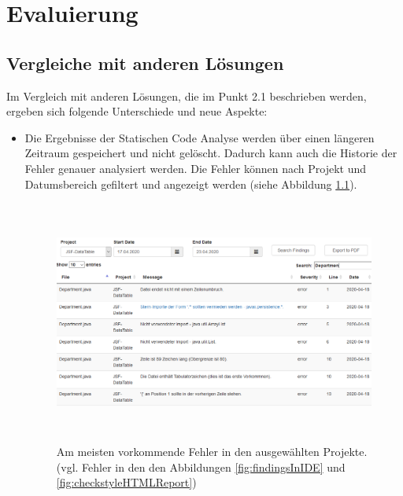 \chapter{Evaluierung}
\section{Vergleiche mit anderen Lösungen} 
Im Vergleich mit anderen Lösungen, die im Punkt 2.1 beschrieben werden, ergeben sich folgende Unterschiede und neue Aspekte: 
\begin{itemize}
\item Die Ergebnisse der Statischen Code Analyse werden über einen längeren Zeitraum gespeichert und nicht gelöscht. Dadurch kann auch die Historie der Fehler genauer analysiert werden. Die Fehler können nach Projekt und Datumsbereich gefiltert und angezeigt werden (siehe Abbildung \ref{fig:tableRec}).

\begin{figure}[tp]
  \centering
  \includegraphics[height=8cm]{images/tableRec.PNG}
 \caption[Am meisten vorkommende Fehler in den ausgewählten Projekte. (vgl. Fehler in den den Abbildungen \ref{fig:checkstyleHTMLReport} und \ref{fig:findingsInIDE})]{Am meisten vorkommende Fehler in den ausgewählten Projekte. (vgl. Fehler in den den Abbildungen \ref{fig:findingsInIDE} und \ref{fig:checkstyleHTMLReport})}
  \label{fig:tableRec}
\end{figure}


\end{itemize}
